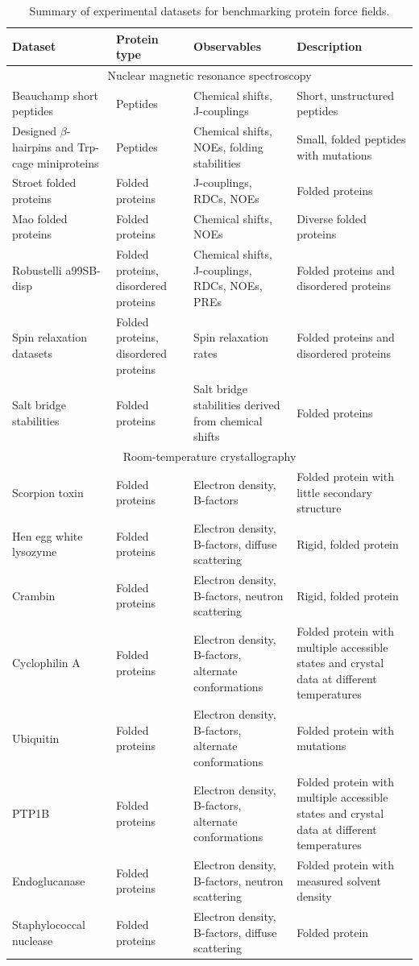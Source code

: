 \documentclass[9pt,review]{livecoms}
\begin{document}
\begin{table}[!ht]
\centering
{}
\begin{tabular}{p{} p{} p{} p{}}
\toprule
Dataset & Protein type & Observables & Description \\
\midrule
\multicolumn{4}{c}{Nuclear magnetic resonance spectroscopy} \\
\midrule
Beauchamp short peptides & Peptides & Chemical shifts, J-couplings & Short, unstructured peptides \\
Designed $\beta$-hairpins and Trp-cage miniproteins & Peptides & Chemical shifts, NOEs, folding stabilities & Small, folded peptides with mutations \\
Stroet folded proteins & Folded proteins & J-couplings, RDCs, NOEs & Folded proteins \\
Mao folded proteins & Folded proteins & Chemical shifts, NOEs & Diverse folded proteins \\
Robustelli a99SB-disp & Folded proteins, disordered proteins & Chemical shifts, J-couplings, RDCs, NOEs, PREs & Folded proteins and disordered proteins \\
Spin relaxation datasets & Folded proteins, disordered proteins & Spin relaxation rates & Folded proteins and disordered proteins \\
Salt bridge stabilities & Folded proteins & Salt bridge stabilities derived from chemical shifts & Folded proteins \\
\midrule
\multicolumn{4}{c}{Room-temperature crystallography} \\
\midrule
Scorpion toxin & Folded proteins & Electron density, B-factors & Folded protein with little secondary structure \\
Hen egg white lysozyme & Folded proteins & Electron density, B-factors, diffuse scattering & Rigid, folded protein \\
Crambin & Folded proteins & Electron density, B-factors, neutron scattering & Rigid, folded protein \\
Cyclophilin A & Folded proteins & Electron density, B-factors, alternate conformations & Folded protein with multiple accessible states and crystal data at different temperatures \\
Ubiquitin & Folded proteins & Electron density, B-factors, alternate conformations & Folded protein with mutations \\
PTP1B & Folded proteins & Electron density, B-factors, alternate conformations & Folded protein with multiple accessible states and crystal data at different temperatures \\
Endoglucanase & Folded proteins & Electron density, B-factors, neutron scattering & Folded protein with measured solvent density \\
Staphylococcal nuclease & Folded proteins & Electron density, B-factors, diffuse scattering & Folded protein \\
\bottomrule
\end{tabular}
\caption{Summary of experimental datasets for benchmarking protein force fields.}
\label{tab:datasets}
\end{table}
\end{document}
